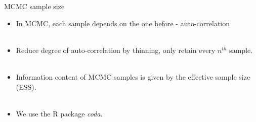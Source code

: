 \documentclass[compress]{beamer}
\begin{document}
\begin{frame}[label=sec-8-9]{MCMC sample size}
\begin{itemize}
\item In MCMC, each sample depends on the one before - \alert{auto-correlation} \\~\\
\item Reduce degree of auto-correlation by \alert{thinning}, only retain every $n^{th}$ sample. \\~\\
\item Information content of MCMC samples is given by the \alert{effective sample size (ESS)}. \\~\\
\item We use the R package \textit{coda}.
\end{itemize}
\end{frame}
\end{document}

